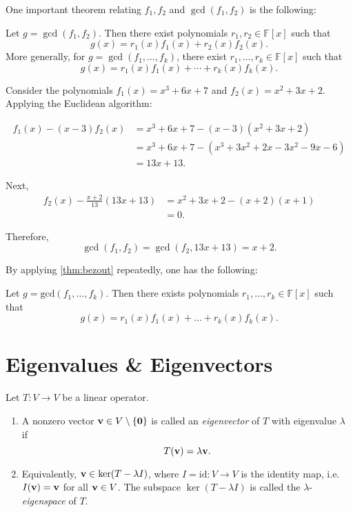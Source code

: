 \medskip
One important theorem relating $f_1, f_2$ and $\gcd(f_1,f_2)$ is the following:
\begin{theorem}\label{thm:bezout}
Let \(g = \gcd(f_1, f_2)\). Then there exist polynomials \(r_1, r_2 \in \mathbb{F}[x]\) such that
\[
g(x) = r_1(x) f_1(x) + r_2(x) f_2(x).
\]
More generally, for \(g = \gcd(f_1, \ldots, f_k)\), there exist \(r_1, \ldots, r_k \in \mathbb{F}[x]\) such that
\[
g(x) = r_1(x) f_1(x) + \cdots + r_k(x) f_k(x).
\]
\end{theorem}

\begin{example}
Consider the polynomials \(f_1(x) = x^3 + 6x + 7\) and \(f_2(x) = x^2 + 3x + 2\). Applying the Euclidean algorithm:

\begin{align*}
f_1(x) - (x - 3)f_2(x) &= x^3 + 6x + 7 - (x - 3)(x^2 + 3x + 2) \\
&= x^3 + 6x + 7 - (x^3 + 3x^2 + 2x - 3x^2 - 9x - 6) \\
&= 13x + 13.
\end{align*}

Next,
\begin{align*}
f_2(x) - \frac{x + 2}{13}(13x + 13) &= x^2 + 3x + 2 - (x + 2)(x + 1) \\
&= 0.
\end{align*}

Therefore,
\[
\gcd(f_1, f_2) = \gcd(f_2, 13x + 13) = x + 2.
\]
\end{example}

By applying \autoref{thm:bezout} repeatedly, one has the following:
\begin{corollary} \label{cor:bezout}
    Let $g = \mathrm{gcd}(f_1, \dots, f_k)$. Then there exists polynomials $r_1, \dots, r_k \in \mathbb{F}[x]$ such that
    $$g(x) = r_1(x)f_1(x) + \dots + r_k(x)f_k(x).$$
\end{corollary}


\section{Eigenvalues \& Eigenvectors}

\begin{definition}\label{def:eigenvalue}
Let \( T : V \to V \) be a linear operator.

\begin{enumerate}
  \item A nonzero vector \( {\bf v} \in V \setminus \{ \mathbf{0} \} \) is called an \emph{eigenvector} of \(T\) with eigenvalue \(\lambda\) if
  \[
  T({\bf v}) = \lambda {\bf v}.
  \]
  
  \item Equivalently, \({\bf v} \in \ker(T - \lambda I)\), where \(I = \mathrm{id} : V \to V\) is the identity map, i.e. \(I({\bf v}) = {\bf v}\) for all \({\bf v} \in V\). The subspace \(\ker(T - \lambda I)\) is called the \(\lambda\)-\emph{eigenspace} of \(T\).
\end{enumerate}
\end{definition}

